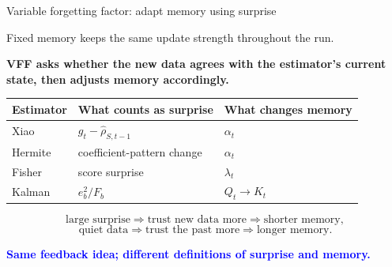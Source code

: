 \documentclass[aspectratio=169,11pt]{beamer}
\newcommand{\good}[1]{\textcolor{blue}{\textbf{#1}}}
\begin{document}
\begin{frame}{Variable forgetting factor: adapt memory using surprise}

  Fixed memory keeps the same update strength throughout the run.

  \medskip

  \textbf{VFF asks whether the new data agrees with the estimator's current state,
  then adjusts memory accordingly.}

  \medskip

  \begin{center}
  \small
  \begin{tabular}{lll}
    \toprule
    Estimator & What counts as surprise & What changes memory \\
    \midrule
    Xiao
      & $g_t-\widehat\rho_{S,t-1}$
      & $\alpha_t$ \\

    Hermite
      & coefficient-pattern change
      & $\alpha_t$ \\

    Fisher
      & score surprise
      & $\lambda_t$ \\

    Kalman
      & $e_b^2/F_b$
      & $Q_t \rightarrow K_t$ \\
    \bottomrule
  \end{tabular}
  \end{center}

  \[
    \text{large surprise}
    \Rightarrow
    \text{trust new data more}
    \Rightarrow
    \text{shorter memory},
  \]
  \[
    \text{quiet data}
    \Rightarrow
    \text{trust the past more}
    \Rightarrow
    \text{longer memory}.
  \]

  \good{Same feedback idea; different definitions of surprise and memory.}

\end{frame}
\end{document}

